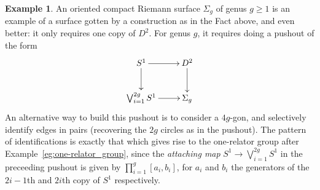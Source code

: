 \documentclass{tufte-handout}
\theoremstyle{definition}
\newtheorem{example}{Example}
\begin{document}
\begin{example}
An oriented compact Riemann surface $\Sigma_g$ of genus $g\geq 1$ is an example of a 
 surface gotten by a construction as in the Fact above, and even better: it only 
 requires one copy of $D^2$. For genus $g$, it requires doing a pushout of the form
\[
\xymatrixnocompile{
	S^1 \ar[d] \ar[r] & D^2 \ar[d] \\
	\bigvee_{i=1}^{2g} S^1 \ar[r] & \Sigma_g
}
\]
An alternative way to build this pushout is to consider a $4g$-gon, and selectively identify edges in pairs (recovering the 
$2g$ circles as in the pushout). The pattern of identifications is exactly that which 
gives rise to the one-relator group after Example~\ref{eg:one-relator_group}, since the 
\emph{attaching map} $S^1 \to \bigvee_{i=1}^{2g} S^1$ in the preceeding pushout is given 
by $\prod_{i=1}^g[a_i,b_i]$, for $a_i$ and $b_i$ the generators of the $2i-1$th and 
$2i$th copy of $S^1$ respectively.
\end{example}
\end{document}
